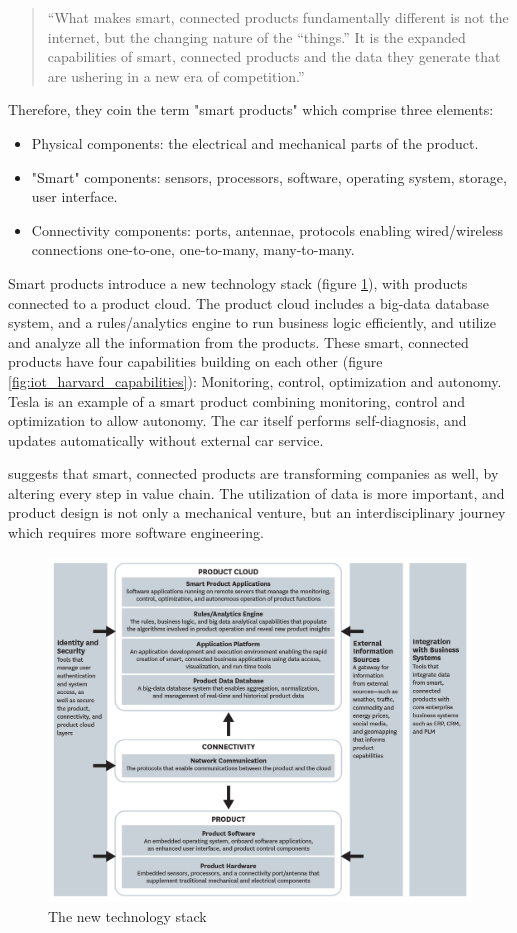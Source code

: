 \blockquote{\enquote{What makes smart, connected products fundamentally different is not the internet,
but the changing nature of the “things.” It is the expanded capabilities of smart, connected
products and the data they generate that are ushering in a new era of competition.}}

Therefore, they coin the term "smart products" which comprise three elements:

\begin{itemize}
    \item Physical components: the electrical and mechanical parts of the product.
    \item "Smart" components: sensors, processors, software, operating system, storage, user interface.
    \item Connectivity components: ports, antennae, protocols enabling wired/wireless connections
    one-to-one, one-to-many, many-to-many.
\end{itemize}
Smart products introduce a new technology stack (figure \ref{fig:iot_harvard_smart}), with products connected to a product cloud.
The product cloud includes a big-data database system, and a rules/analytics engine to run business logic efficiently,
and utilize and analyze all the information from the products. These smart, connected products have four capabilities building
on each other (figure \ref{fig:iot_harvard_capabilities}): Monitoring, control, optimization and autonomy.
Tesla is an example of a smart product combining monitoring, control and optimization to allow autonomy. The car itself performs
self-diagnosis, and updates automatically without external car service.

\citet{iot_harvard_smartcompanies} suggests that smart, connected products are transforming companies as well, by altering
every step in value chain. The utilization of data is more important, and product design is not only a mechanical venture,
but an interdisciplinary journey which requires more software engineering.

\begin{figure}
\includegraphics[width=1.1\textwidth,center]{fig/harvard_technology}
\caption{The new technology stack \citep{iot_harvard_smart}}
\label{fig:iot_harvard_smart}
\end{figure}


